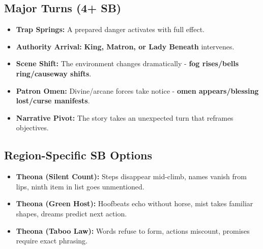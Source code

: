 \subsection*{Major Turns (4+ SB)}
\begin{itemize}
\item \textbf{Trap Springs:} A prepared danger activates with full effect.
\item \textbf{Authority Arrival:} \textbf{King, Matron, or Lady Beneath} intervenes.
\item \textbf{Scene Shift:} The environment changes dramatically - \textbf{fog rises/bells ring/causeway shifts}.
\item \textbf{Patron Omen:} Divine/arcane forces take notice - \textbf{omen appears/blessing lost/curse manifests}.
\item \textbf{Narrative Pivot:} The story takes an unexpected turn that reframes objectives.
\end{itemize}

\subsection*{Region-Specific SB Options}
\begin{itemize}
\item \textbf{Theona (Silent Count):} Steps disappear mid-climb, names vanish from lips, ninth item in list goes unmentioned.
\item \textbf{Theona (Green Host):} Hoofbeats echo without horse, mist takes familiar shapes, dreams predict next action.
\item \textbf{Theona (Taboo Law):} Words refuse to form, actions miscount, promises require exact phrasing.
\end{itemize}
